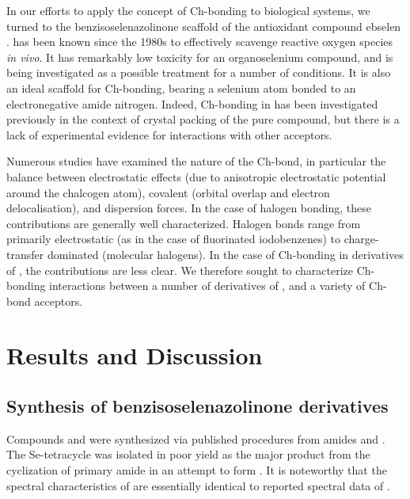 \begin{refsection}
    In our efforts to apply the concept of Ch-bonding to biological systems, we turned to the benzisoselenazolinone scaffold of the antioxidant compound ebselen .
     has been known since the 1980s to effectively scavenge reactive oxygen species \emph{in vivo}.\autocite{Muller1984}
    It has remarkably low toxicity for an organoselenium compound, and is being investigated as a possible treatment for a number of conditions.\autocite{Schewe1995,Kil2007,Singh2013,Parnham2000}
    It is also an ideal scaffold for Ch-bonding, bearing a selenium atom bonded to an electronegative amide nitrogen.
    Indeed, Ch-bonding in  has been investigated previously in the context of crystal packing of the pure compound, but there is a lack of experimental evidence for interactions with other acceptors.\autocite{Thomas2015}
    
    Numerous studies have examined the nature of the Ch-bond, in particular the balance between electrostatic effects (due to anisotropic electrostatic potential around the chalcogen atom), covalent (orbital overlap and electron delocalisation), and dispersion forces.\autocite{Oliveira2017,Pascoe2017,DeVleeschouwer2017,Kolar2016,Gleiter2018}
    In the case of halogen bonding, these contributions are generally well characterized.
    Halogen bonds range from primarily electrostatic (as in the case of fluorinated iodobenzenes\autocite{Prasang2009}) to charge-transfer dominated (molecular halogens\autocite{Mulliken1950}).
    In the case of Ch-bonding in derivatives of , the contributions are less clear.
    We therefore sought to characterize Ch-bonding interactions between a number of derivatives of , and a variety of Ch-bond acceptors.
    
    
    \section{Results and Discussion}
    \subsection[Synthesis of \refcmpd{ebs,ebs.bn,tetracycle}]{Synthesis of benzisoselenazolinone derivatives }
    Compounds  and  were synthesized via published procedures from amides  and .\autocite{Bhabak2010}
    The Se-tetracycle  was isolated in poor yield as the major product from the cyclization of primary amide  in an attempt to form .
    It is noteworthy that the spectral characteristics of  are essentially identical to reported spectral data of \autocite{Bhabak2010}.
    

\end{refsection}
